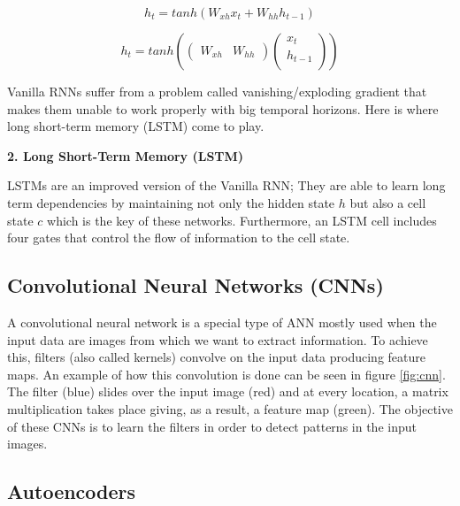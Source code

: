 \begin{equation}
h_t=tanh(W_{xh}x_t+W_{hh}h_{t−1})
\end{equation}


\begin{equation}
h_t = tanh\left(\begin{pmatrix}
W_{xh} & W_{hh}
\end{pmatrix}
\begin{pmatrix}
x_t \\
h_{t−1} \\
\end{pmatrix}\right)
\label{eq:vanilla_rnn}
\end{equation}


Vanilla RNNs suffer from a problem called vanishing/exploding gradient that makes them unable to work properly with big temporal horizons. Here is where long short-term memory (LSTM) come to play.

\vspace{5mm} 
\textbf{2. Long Short-Term Memory (LSTM)}

LSTMs are an improved version of the Vanilla RNN; They are able to learn long term dependencies by maintaining not only the hidden state $h$ but also a cell state $c$ which is the key of these networks. Furthermore, an LSTM cell includes four gates that control the flow of information to the cell state.

\subsection{Convolutional Neural Networks (CNNs)}


A convolutional neural network is a special type of ANN mostly used when the input data are images from which we want to extract information. To achieve this, filters (also called kernels) convolve on the input data producing feature maps. An example of how this convolution is done can be seen in figure \ref{fig:cnn}. The filter (blue) slides over the input image (red) and at every location, a matrix multiplication takes place giving, as a result, a feature map (green). The objective of these CNNs is to learn the filters in order to detect patterns in the input images.









\subsection{Autoencoders}

